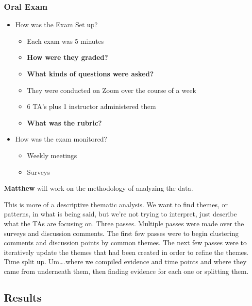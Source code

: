 \documentclass[
  letterpaper,
  DIV=11,
  numbers=noendperiod]{scrartcl}
\providecommand{\tightlist}{%
  \setlength{\itemsep}{0pt}\setlength{\parskip}{0pt}}\usepackage{longtable,booktabs,array}
\begin{document}
\hypertarget{oral-exam}{%
\subsubsection{Oral Exam}\label{oral-exam}}

\begin{itemize}
\tightlist
\item
  How was the Exam Set up?

  \begin{itemize}
  \tightlist
  \item
    Each exam was 5 minutes
  \item
    \textbf{How were they graded?}
  \item
    \textbf{What kinds of questions were asked?}
  \item
    They were conducted on Zoom over the course of a week
  \item
    6 TA's plus 1 instructor administered them
  \item
    \textbf{What was the rubric?}
  \end{itemize}
\item
  How was the exam monitored?

  \begin{itemize}
  \tightlist
  \item
    Weekly meetings
  \item
    Surveys
  \end{itemize}
\end{itemize}

\textbf{Matthew} will work on the methodology of analyzing the data.

This is more of a descriptive thematic analysis. We want to find themes,
or patterns, in what is being said, but we're not trying to interpret,
just describe what the TAs are focusing on. Three passes. Multiple
passes were made over the surveys and discussion comments. The first few
passes were to begin clustering comments and discussion points by common
themes. The next few passes were to iteratively update the themes that
had been created in order to refine the themes. Time split up.
Um\ldots.where we compiled evidence and time points and where they came
from underneath them, then finding evidence for each one or splitting
them.

\hypertarget{results}{%
\subsection{Results}\label{results}}
\end{document}
